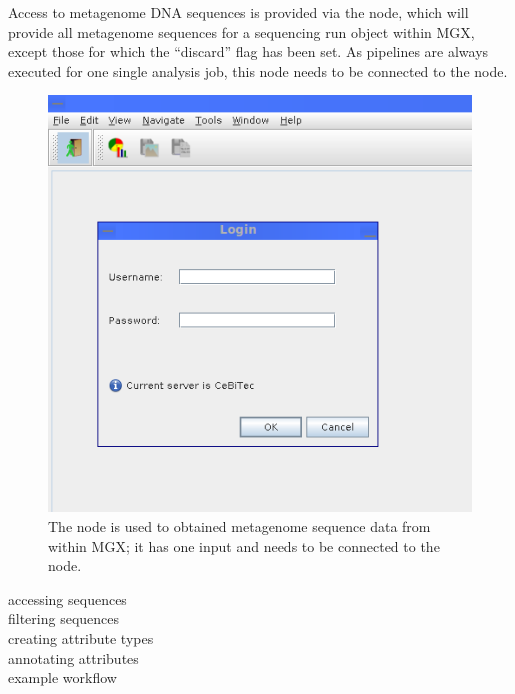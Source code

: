 Access to metagenome DNA sequences is provided via the  node, which will provide
all metagenome sequences for a sequencing run object within MGX, except those for which the 
``discard'' flag has been set. As pipelines are always executed
for one single analysis job, this node needs to be connected to the  node.\\

\begin{figure}[ht]
\centering
\includegraphics[width=.5\textwidth]{img/login-screen}
\caption[]{The  node is used to obtained metagenome sequence data 
from within MGX; it has one input and needs to be connected to the  node.}
\label{readcsf}
\end{figure}

accessing sequences\\
filtering sequences\\
creating attribute types\\
annotating attributes\\
example workflow\\


